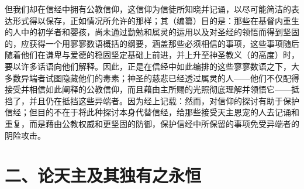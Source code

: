 但我们却在信经中拥有公教信仰，这信仰为信徒所知晓并记诵，以尽可能简洁的表达形式得以保存，正如情况所允许的那样；其（编纂）目的是：那些在基督内重生的人中的初学者和婴孩，尚未通过勤勉和属灵的运用以及对圣经的领悟而得到坚固的，应获得一个用寥寥数语概括的纲要，涵盖那些必须相信的事项，这些事项随后随着他们在谦卑与爱德的稳固坚定基础上前进，并上升至神圣教义（的高度）时，要以许多话语向他们解释。因此，正是在信经中如此编排的这些寥寥数语之下，大多数异端者试图隐藏他们的毒素；神圣的慈悲已经透过属灵的人——他们不仅配得接受并相信如此阐释的公教信仰，而且藉由主所赐的光照彻底理解并领悟它——抵挡了，并且仍在抵挡这些异端者。因为经上记载：然而，对信仰的探讨有助于保护信经；但目的不在于将此种探讨本身代替信经，给那些接受天主恩宠的人去记诵和重复，而是藉由公教权威和更坚固的防御，保护信经中所保留的事项免受异端者的阴险攻击。\par


\section{二、论天主及其独有之永恒}

